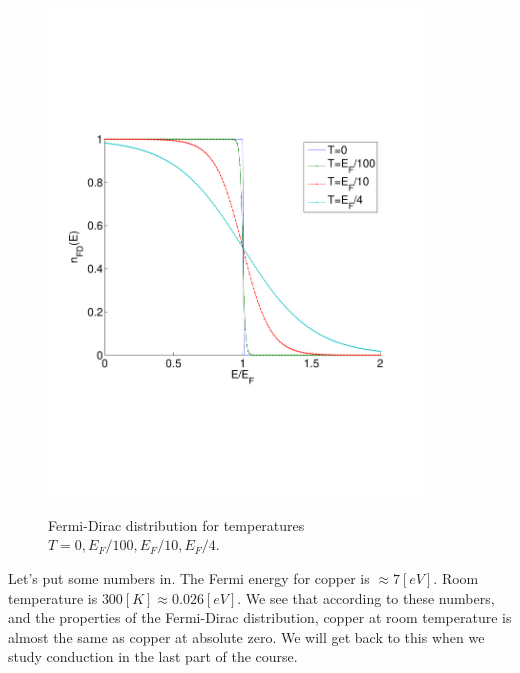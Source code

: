 \documentclass{Textbook}
\begin{document}
\begin{figure}[!ht]
  \centering
  \includegraphics[width=10cm]{fermi_dirac.pdf}\\
  \caption{Fermi-Dirac distribution for temperatures $T=0,E_F/100,E_F/10,E_F/4$.}
  \label{fig:fermi_dirac}
\end{figure}
Let's put some numbers in. The Fermi energy for copper is $\approx 7[eV]$. Room temperature is $300[K] \approx 0.026[eV]$. We see that according to these numbers, and the properties of the Fermi-Dirac distribution, copper at room temperature is almost the same as copper at absolute zero. We will get back to this when we study conduction in the last part of the course.
\end{document}
